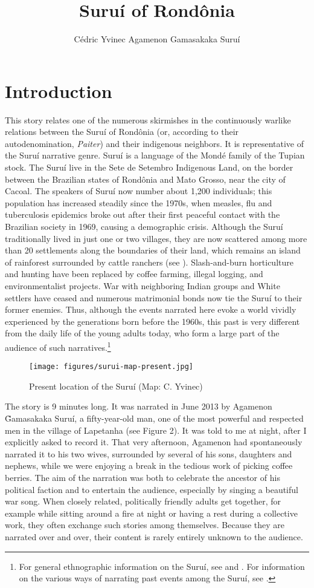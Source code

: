 \documentclass[output=paper,
modfonts,nonflat
]{langsci/langscibook}
\author{Cédric Yvinec\affiliation{CNRS/Mondes Américains, Paris, France}%
\lastand Agamenon Gamasakaka Suruí%
}%
\title{Suruí of Rondônia}
\begin{document}
\section{Introduction} 

This story relates one of the numerous skirmishes in the continuously warlike relations between the Suruí of Rondônia (or, according to their autodenomination, \textit{Paiter}) and their indigenous neighbors. It is representative of the Suruí narrative genre. Suruí is a language of the Mondé family of the Tupian stock. The Suruí live in the Sete de Setembro Indigenous Land, on the border between the Brazilian states of Rondônia and Mato Grosso, near the city of Cacoal. The speakers of Suruí now number about 1,200 individuals; this population has increased steadily since the 1970s, when measles, flu and tuberculosis epidemics broke out after their first peaceful contact with the Brazilian society in 1969, causing a demographic crisis. Although the Suruí traditionally lived in just one or two villages, they are now scattered among more than 20 settlements along the boundaries of their land, which remains an island of rainforest surrounded by cattle ranchers (see ). Slash-and-burn horticulture and hunting have been replaced by coffee farming, illegal logging, and environmentalist projects. War with neighboring Indian groups and White settlers have ceased and numerous matrimonial bonds now tie the Suruí to their former enemies. Thus, although the events narrated here evoke a world vividly experienced by the generations born before the 1960s, this past is very different from the daily life of the young adults today, who form a large part of the audience of such narratives.\footnote{For general ethnographic information on the Suruí, see \citet{Mindlin1985,Mindlin1996} and \citet{Yvinec2011}. For information on the various ways of narrating past events among the Suruí, see \citet{Yvinec2016}.}

\begin{figure} [t]
\texttt{[image: figures/surui-map-present.jpg]}
\caption{Present location of the Suruí (Map: C. Yvinec)}
\label{fig:surui:1}
\end{figure}

The story is 9 minutes long. It was narrated in June 2013 by Agamenon \~{G}amasakaka Suruí, a fifty-year-old man, one of the most powerful and respected men in the village of Lapetanha (see Figure 2). It was told to me at night, after I explicitly asked to record it. That very afternoon, Agamenon had spontaneously narrated it to his two wives, surrounded by several of his sons, daughters and nephews, while we were enjoying a break in the tedious work of picking coffee berries. The aim of the narration was both to celebrate the ancestor of his political faction and to entertain the audience, especially by singing a beautiful war song. When closely related, politically friendly adults get together, for example while sitting around a fire at night or having a rest during a collective work, they often exchange such stories among themselves. Because they are narrated over and over, their content is rarely entirely unknown to the audience. 
\end{document}
